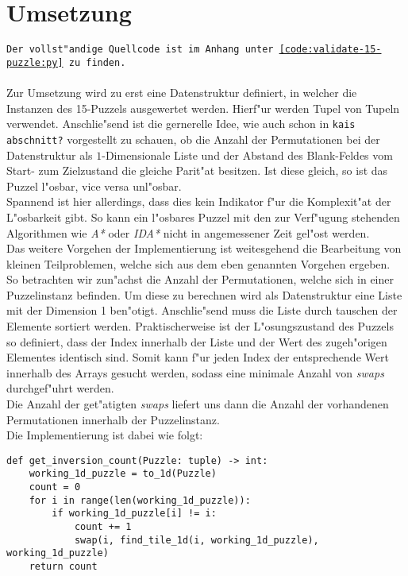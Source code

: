 \section{Umsetzung} %
\label{cha:Umsetzung}
\texttt{Der vollst"andige Quellcode ist im Anhang unter \ref{code:validate-15-puzzle:py} zu finden.}\\\\
Zur Umsetzung wird zu erst eine Datenstruktur definiert, in welcher die Instanzen des 15-Puzzels ausgewertet werden. Hierf"ur werden Tupel von Tupeln verwendet.
Anschlie"send ist die gernerelle Idee, wie auch schon in \texttt{kais abschnitt?} vorgestellt zu schauen, ob die Anzahl der Permutationen bei der Datenstruktur als $1$-Dimensionale Liste und der Abstand des Blank-Feldes vom Start- zum Zielzustand die gleiche Parit"at besitzen.
Ist diese gleich, so ist das Puzzel l"osbar, vice versa unl"osbar.\\
Spannend ist hier allerdings, dass dies kein Indikator f"ur die Komplexit"at der L"osbarkeit gibt. So kann ein l"osbares Puzzel mit den zur Verf"ugung stehenden Algorithmen wie \textit{A*} oder \textit{IDA*} nicht in angemessener Zeit gel"ost werden.\\
Das weitere Vorgehen der Implementierung ist weitesgehend die Bearbeitung von kleinen Teilproblemen, welche sich aus dem eben genannten Vorgehen ergeben.\\
So betrachten wir zun"achst die Anzahl der Permutationen, welche sich in einer Puzzelinstanz befinden. Um diese zu berechnen wird als Datenstruktur eine Liste mit der Dimension 1 ben"otigt.
Anschlie"send muss die Liste durch tauschen der Elemente sortiert werden.
Praktischerweise ist der L"osungszustand des Puzzels so definiert, dass der Index innerhalb der Liste und der Wert des zugeh"origen Elementes identisch sind. Somit kann f"ur jeden Index der entsprechende Wert innerhalb des Arrays gesucht werden, sodass eine minimale Anzahl von \textit{swaps} durchgef"uhrt werden. \\Die Anzahl der get"atigten \textit{swaps} liefert uns dann die Anzahl der vorhandenen Permutationen innerhalb der Puzzelinstanz.\\
Die Implementierung ist dabei wie folgt:
\begin{verbatim}
def get_inversion_count(Puzzle: tuple) -> int:
    working_1d_puzzle = to_1d(Puzzle)
    count = 0
    for i in range(len(working_1d_puzzle)):
        if working_1d_puzzle[i] != i:
            count += 1
            swap(i, find_tile_1d(i, working_1d_puzzle), working_1d_puzzle)
    return count
\end{verbatim}
